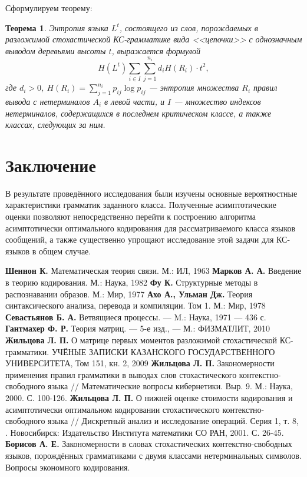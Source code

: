 \documentclass[12pt]{article}
\newtheorem{theorem}{Теорема}
\begin{document}
Сформулируем теорему:
\begin{theorem}
	Энтропия языка $L^t$, состоящего из слов, порождаемых в разложимой стохастической КС-грамматике вида <<цепочки>> с однозначным выводом деревьями высоты $t$, выражается формулой
	\begin{equation*}
		H(L^t)  \sum_{i \in I} \sum_{j=1}^{n_i} d_i H(R_i) \cdot t^2,
	\end{equation*}
	где $d_i > 0$, $H(R_i) = \sum_{j=1}^{n_i} p_{ij} \log p_{ij}$ --- энтропия множества $R_i$ правил вывода с нетерминалов $A_i$ в левой части, и $I$ --- множество индексов нетерминалов, содержащихся в последнем критическом классе, а также классах, следующих за ним.
\end{theorem}

\section{Заключение}

В результате проведённого исследования были изучены основные вероятностные характеристики грамматик заданного класса. Полученные асимптотические оценки позволяют непосредственно перейти к построению алгоритма асимптотически оптимального кодирования для рассматриваемого класса языков сообщений, а также существенно упрощают исследование этой задачи для КС-языков в общем случае.

\newpage

\begin{thebibliography}{99}
	\textbf{Шеннон К.} Математическая теория связи. М.: ИЛ, 1963
	\textbf{Марков А. А.} Введение в теорию кодирования. М.: Наука, 1982
	\textbf{Фу К.} Структурные методы в распознавании образов. М.: Мир, 1977
	\textbf{Ахо А., Ульман Дж.} Теория синтаксического анализа, перевода и компиляции. Том 1. М.: Мир, 1978
	\textbf{Севастьянов Б. А.} Ветвящиеся процессы. --- M.: Наука, 1971 --- 436 с.
	\textbf{Гантмахер Ф. Р.} Теория матриц. --- 5-е изд., --- М.: ФИЗМАТЛИТ, 2010
	\textbf{Жильцова Л. П.} О матрице первых моментов разложимой стохастической КС-грамматики. УЧЁНЫЕ ЗАПИСКИ КАЗАНСКОГО ГОСУДАРСТВЕННОГО УНИВЕРСИТЕТА, Том 151, кн. 2, 2009
	\textbf{Жильцова Л. П.} Закономерности применения правил грамматики в выводах слов стохастического контекстно-свободного языка // Математические вопросы кибернетики. Выр. 9. М.: Наука, 2000. С. 100-126.
	\textbf{Жильцова Л. П.} О нижней оценке стоимости кодирования и асимптотически оптимальном кодировании стохастического контекстно-свободного языка // Дискретный анализ и исследование операций. Серия 1, т. 8, . Новосибирск: Издательство Института математики СО РАН, 2001. С. 26-45.
	\textbf{Борисов А. Е.} Закономерности в словах стохастических контекстно-свободных языков, порождённых грамматиками с двумя классами нетерминальных символов. Вопросы экономного кодирования.
\end{thebibliography}
\end{document}
